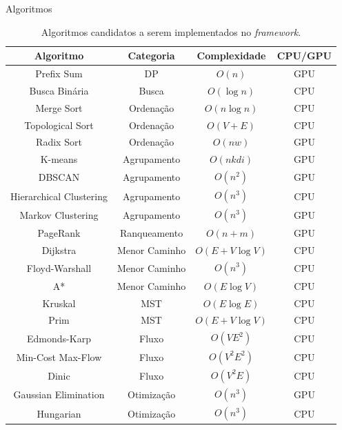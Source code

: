 \begin{frame}{Algoritmos}
    \begin{table}[ht]
        \centering
        \scriptsize
        \begin{tabular}{|c|c|c|c|}
            \hline
            \textbf{Algoritmo} & \textbf{Categoria} & \textbf{Complexidade} & \textbf{CPU/GPU} \\
            \hline
            Prefix Sum & DP & $O(n)$ & GPU \\
            \hline
            Busca Binária & Busca & $O(\log n)$ & CPU \\
            \hline
            Merge Sort & Ordenação & $O(n \log n)$ & CPU \\
            \hline
            Topological Sort & Ordenação & $O(V + E)$ & CPU \\
            \hline
            Radix Sort & Ordenação & $O(nw)$ & GPU \\
            \hline
            K-means & Agrupamento & $O(nkdi)$ & GPU \\
            \hline
            DBSCAN & Agrupamento & $O(n^2)$ & GPU \\
            \hline
            Hierarchical Clustering & Agrupamento & $O(n^3)$ & CPU \\
            \hline
            Markov Clustering & Agrupamento & $O(n^3)$ & GPU \\
            \hline
            PageRank & Ranqueamento & $O(n + m)$ & GPU \\
            \hline
            Dijkstra & Menor Caminho & $O(E + V \log V)$ & CPU \\
            \hline
            Floyd-Warshall & Menor Caminho & $O(n^3)$ & CPU \\
            \hline
            A* & Menor Caminho & $O(E \log V)$ & CPU \\
            \hline
            Kruskal & MST & $O(E \log E)$ & CPU \\
            \hline
            Prim & MST & $O(E + V \log V)$ & CPU \\
            \hline
            Edmonds-Karp & Fluxo & $O(VE^2)$ & CPU \\
            \hline
            Min-Cost Max-Flow & Fluxo & $O(V^2E^2)$ & CPU \\
            \hline
            Dinic & Fluxo & $O(V^2E)$ & CPU \\
            \hline
            Gaussian Elimination & Otimização & $O(n^3)$ & GPU \\
            \hline
            Hungarian & Otimização & $O(n^3)$ & CPU \\
            \hline
        \end{tabular}
        \caption{Algoritmos candidatos a serem implementados no \textit{framework}.}
        \label{table:algorithms}
    \end{table}
\end{frame}

